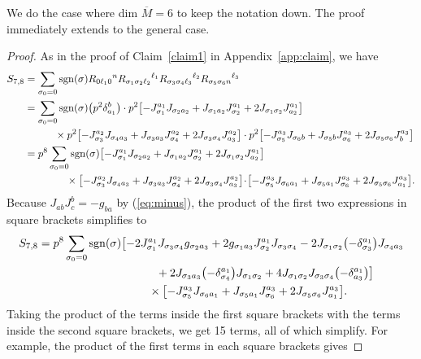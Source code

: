 \documentclass[pdftex]{sigma}
\numberwithin{equation}{section}
\theoremstyle{definition}
\newcommand{\sgn}{{\rm sgn}}
\newcommand{\om}{\overline{M}}
\newcommand{\barcurvature}[2]{R_{#1}{}^{#2}}
\newcommand{\ssuzero}{\sum_{\sigma_0 = 0} \sgn(\sigma)}
\begin{document}
We do the case where dim $\om = 6$ to keep the notation down. The proof immediately extends to the general case.

\begin{proof}As in the proof of Claim~\ref{claim1} in Appendix~\ref{app:claim}, we have
\begin{align}\label{S78}
S_{7,8} &=\ssuzero\barcurvature{0\ell_1 0}{n}\barcurvature{\sigma_1 \sigma_2\ell_2}{\ell_1}
\barcurvature{\sigma_3\sigma_4\ell_3}{\ell_2}\barcurvature{\sigma_5\sigma_6 n}{\ell_3}\\
&= \ssuzero \bigl(p^2\delta_{a_1}^b\bigr)\cdot p^2\bigl[-J_{\sigma_1}^{a_1}J_{\sigma_2a_2} + J_{\sigma_1a_2}J_{\sigma_2}^{a_1}
+2J_{\sigma_1\sigma_2}J_{a_2}^{a_1}\bigr]\nonumber\\
&\hphantom{=\sum_{\sigma_0 = 0}}{}\times p^2\bigl[-J_{\sigma_3}^{a_2}J_{\sigma_4a_3} + J_{\sigma_3a_3}J_{\sigma_4}^{a_2}
+2J_{\sigma_3\sigma_4}J_{a_3}^{a_2}\bigr]
 \cdot p^2\bigl[-J_{\sigma_5}^{a_3}J_{\sigma_6b} + J_{\sigma_5 b}J_{\sigma_6}^{a_3}
+2J_{\sigma_5\sigma_6}J_{b}^{a_3}\bigr]\nonumber\\
&= p^8\ssuzero\bigl[-J_{\sigma_1}^{a_1}J_{\sigma_2a_2} + J_{\sigma_1a_2}J_{\sigma_2}^{a_1}
+2J_{\sigma_1\sigma_2}J_{a_2}^{a_1}\bigr]\nonumber\\
&\hphantom{= p^8\sum_{\sigma_0 = 0}} \times
\bigl[-J_{\sigma_3}^{a_2}J_{\sigma_4a_3} + J_{\sigma_3a_3}J_{\sigma_4}^{a_2}
+2J_{\sigma_3\sigma_4}J_{a_3}^{a_2}\bigr]
 \!\cdot \!\bigl[-J_{\sigma_5}^{a_3}J_{\sigma_6a_1} + J_{\sigma_5 a_1}J_{\sigma_6}^{a_3}
+2J_{\sigma_5\sigma_6}J_{a_1}^{a_3}\bigr]. \nonumber
\end{align}
Because $J_{ab}J^b_c
= -g_{ba}$ by (\ref{eq:minus}),
the product of the first
two expressions in square brackets simplifies to
\begin{gather*}
S_{7,8} = p^8\ssuzero\bigl[-2J_{\sigma_1}^{a_1}J_{\sigma_3\sigma_4}g_{\sigma_2a_3}
+2g_{\sigma_1a_3}J_{\sigma_2}^{a_1}J_{\sigma_3\sigma_4}
-2J_{\sigma_1\sigma_2}\bigl(-\delta_{\sigma_3}^{a_1}\bigr)J_{\sigma_4a_3}\\
\hphantom{S_{7,8} = p^8\ssuzero\bigl[}{}
+2J_{\sigma_3a_3}\bigl(-\delta_{\sigma_4}^{a_1}\bigr)J_{\sigma_1\sigma_2}
+4J_{\sigma_1\sigma_2}J_{\sigma_3\sigma_4}\bigl(-\delta_{a_3}^{a_1}\bigr)\bigr]\\
\hphantom{S_{7,8} = p^8\sum_{\sigma_0 = 0}\bigl[}{}
 \times \bigl[-J_{\sigma_5}^{a_3}J_{\sigma_6a_1} + J_{\sigma_5 a_1}J_{\sigma_6}^{a_3}
+2J_{\sigma_5\sigma_6}J_{a_1}^{a_3}\bigr].
\end{gather*}
Taking the product of the terms inside the first square brackets with the terms inside the second square brackets, we get 15 terms, all of which simplify. For example, the product of the first terms in each square brackets gives

\end{proof}
\end{document}
